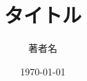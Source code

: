 \documentclass[a4paper,11pt]{article}
\begin{document}
\title{タイトル}
\author{著者名}
\date{\today}
\maketitle

\tableofcontents
\clearpage






\end{document}
